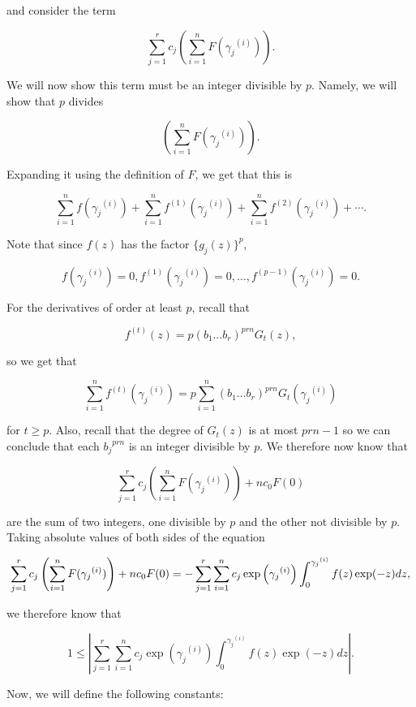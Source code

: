 \documentclass[a4paper, 11pt]{book}
\begin{document}
{    and consider the term

    \[\sum\limits_{j=1}^{r}c_j\left(\sum\limits_{i=1}^{n} F({\gamma_j}^{(i)})\right).\] 

    We will now show this term must be an integer divisible by $p$. Namely, we will show that $p$ divides

    \[\left(\sum\limits_{i=1}^{n} F({\gamma_j}^{(i)})\right).\]

    Expanding it using the definition of $F$, we get that this is

    \[\sum\limits_{i=1}^{n}f({\gamma_j}^{(i)}) + \sum\limits_{i=1}^{n}f^{(1)}({\gamma_j}^{(i)}) + \sum\limits_{i=1}^{n}f^{(2)}({\gamma_j}^{(i)}) + \cdots.\]

    Note that since $f(z)$ has the factor ${\{g_j(z)\}}^{p}$, 

    \[f({\gamma_j}^{(i)}) = 0, f^{(1)}({\gamma_j}^{(i)}) = 0, \ldots, f^{(p-1)}({\gamma_j}^{(i)}) = 0.\]

    For the derivatives of order at least $p$, recall that 

    \[f^{(t)}(z) = p{(b_1\ldots b_r)}^{prn} G_t(z),\]

    so we get that 

    \[\sum\limits_{i=1}^{n}{f^{(t)}}({\gamma_j}^{(i)}) = p \sum\limits_{i=1}^{n} {(b_1\ldots b_r)}^{prn} G_t({\gamma_{j}}^{(i)})\]

    for $t \geq p$. Also, recall that the degree of $G_t(z)$ is at most $prn-1$ so we can conclude that each ${b_j}^{prn}$ is an integer divisible by $p$. We therefore now know that  

    \[\sum\limits_{j=1}^{r}c_j\left(\sum\limits_{i=1}^{n} F({\gamma_j}^{(i)})\right) + nc_0F(0) \]

    are the sum of two integers, one divisible by $p$ and the other not divisible by $p$. Taking absolute values of both sides of the equation

    \[
    \sum\limits_{j=1}^{r}c_j\left(\sum\limits_{i=1}^{n} F({\gamma_j}^{(i)})\right) + nc_0F(0) \\
= - \sum\limits_{j=1}^{r} \sum\limits_{i=1}^{n} c_j\exp\left({\gamma_j}^{(i)}\right) \int_{0}^{{\gamma_j}^{(i)}} f(z) \exp(-z) dz,\]

    we therefore know that 

    \[1 \leq \left\vert \sum\limits_{j=1}^{r} \sum\limits_{i=1}^{n} c_j\exp\left({\gamma_j}^{(i)}\right) \int_{0}^{{\gamma_j}^{(i)}} f(z) \exp(-z) dz\right\vert.\]

    Now, we will define the following constants:

}
\end{document}

